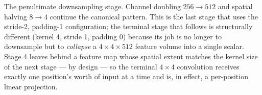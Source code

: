 
The penultimate downsampling stage. Channel doubling $256 \to 512$ and
spatial halving $8 \to 4$ continue the canonical pattern. This is the
last stage that uses the stride-2, padding-1 configuration; the
terminal stage that follows is structurally different (kernel 4, stride
1, padding 0) because its job is no longer to downsample but to
\emph{collapse} a $4 \times 4 \times 512$ feature volume into a single
scalar. Stage 4 leaves behind a feature map whose spatial extent
matches the kernel size of the next stage --- by design --- so the
terminal $4 \times 4$ convolution receives exactly one position's
worth of input at a time and is, in effect, a per-position linear
projection.
